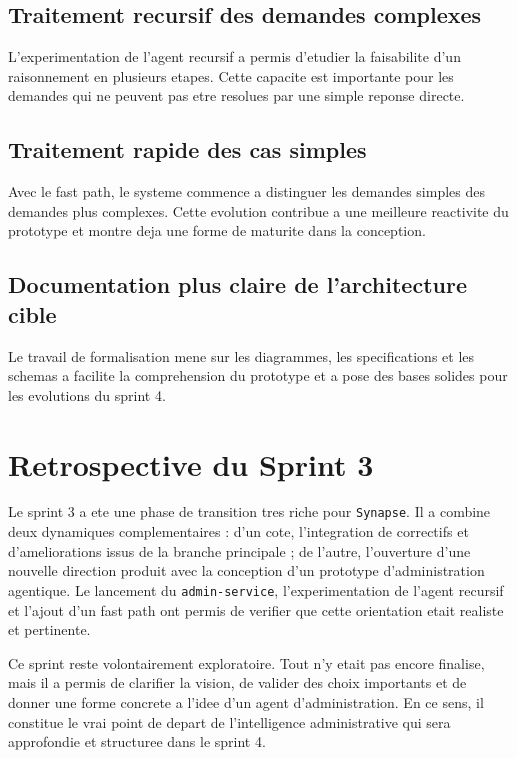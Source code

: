 \subsection{Traitement recursif des demandes complexes}

L'experimentation de l'agent recursif a permis d'etudier la faisabilite d'un raisonnement en plusieurs etapes. Cette capacite est importante pour les demandes qui ne peuvent pas etre resolues par une simple reponse directe.

\subsection{Traitement rapide des cas simples}

Avec le fast path, le systeme commence a distinguer les demandes simples des demandes plus complexes. Cette evolution contribue a une meilleure reactivite du prototype et montre deja une forme de maturite dans la conception.

\subsection{Documentation plus claire de l'architecture cible}

Le travail de formalisation mene sur les diagrammes, les specifications et les schemas a facilite la comprehension du prototype et a pose des bases solides pour les evolutions du sprint 4.

\section{Retrospective du Sprint 3}

Le sprint 3 a ete une phase de transition tres riche pour \texttt{Synapse}. Il a combine deux dynamiques complementaires : d'un cote, l'integration de correctifs et d'ameliorations issus de la branche principale ; de l'autre, l'ouverture d'une nouvelle direction produit avec la conception d'un prototype d'administration agentique. Le lancement du \texttt{admin-service}, l'experimentation de l'agent recursif et l'ajout d'un fast path ont permis de verifier que cette orientation etait realiste et pertinente.

Ce sprint reste volontairement exploratoire. Tout n'y etait pas encore finalise, mais il a permis de clarifier la vision, de valider des choix importants et de donner une forme concrete a l'idee d'un agent d'administration. En ce sens, il constitue le vrai point de depart de l'intelligence administrative qui sera approfondie et structuree dans le sprint 4.

